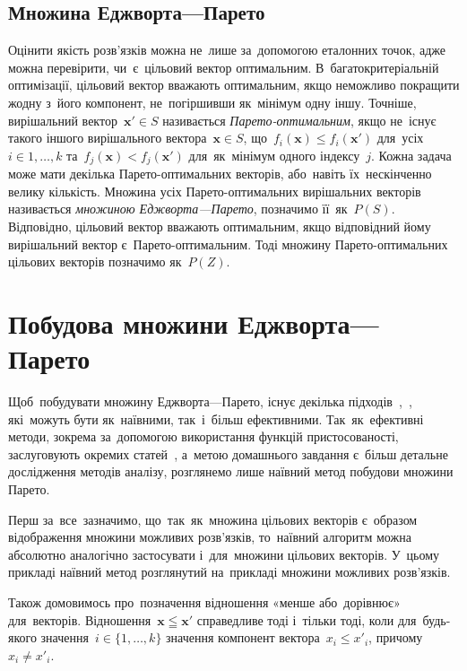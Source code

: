 \documentclass[
  a4paper,
  oneside,
  BCOR = 10mm,
  DIV = 12,
  12pt,
  headings = normal,
]{scrartcl}
\newcommand{\vect}[1]{\mathbf{#1}}
\begin{document}
    \subsection{Множина Еджворта—Парето}
      \label{ssec:pareto-set}
      Оцінити якість розв'язків можна не~лише за~допомогою еталонних точок, адже можна перевірити, чи~є~цільовий вектор оптимальним. В~багатокритеріальній оптимізації, цільовий вектор вважають оптимальним, якщо неможливо покращити жодну з~його компонент, не~погіршивши як~мінімум одну іншу. Точніше, вирішальний вектор~$\vect{x'} \in S$ називається \emph{Парето-оптимальним}, якщо не~існує такого іншого вирішального вектора~$\vect{x} \in S$, що~$f_i (\vect{x}) \leqslant f_i (\vect{x'})$ для~усіх~$i \in {1, \dots, k}$ та~$f_j (\vect{x}) < f_j(\vect{x'})$ для~як~мінімум одного індексу~$j$. Кожна задача може мати декілька Парето-оптимальних векторів, або~навіть їх~нескінченно велику кількість. Множина усіх Парето-оптимальних вирішальних векторів називається \emph{множиною Еджворта—Парето}, позначимо її~як~$P(S)$. Відповідно, цільовий вектор вважають оптимальним, якщо відповідний йому вирішальний вектор є~Парето-оптимальним. Тоді множину Парето-оптимальних цільових векторів позначимо як~$P(Z)$.

    \section{Побудова множини Еджворта—Парето}
      Щоб~побудувати множину Еджворта—Парето, існує декілька підходів~\cite{ehlers-pareto-front},~\cite{toth-compute-pareto-set}, які~можуть бути як~наївними, так~і~більш ефективними. Так~як~ефективні методи, зокрема за~допомогою використання функцій пристосованості, заслуговують окремих статей~\cite{songqing-efficient-pareto-set}, а~метою домашнього завдання є~більш детальне дослідження методів аналізу, розглянемо лише наївний метод побудови множини Парето.

      Перш за~все~зазначимо, що~так~як~множина цільових векторів є~образом відображення множини можливих розв'язків, то~наївний алгоритм можна абсолютно аналогічно застосувати і~для~множини цільових векторів. У~цьому прикладі наївний метод розглянутий на~прикладі множини можливих розв'язків.

      Також домовимось про~позначення відношення «менше або~дорівнює» для~векторів. Відношення~$\vect{x} \leqq \vect{x'}$ справедливе тоді і~тільки тоді, коли для~будь-якого значення~$i \in \{1, \dots, k\}$ значення компонент вектора~$x_{i} \leqslant x'_{i}$, причому~$x_{i} \neq x'_{i}$.
\end{document}
